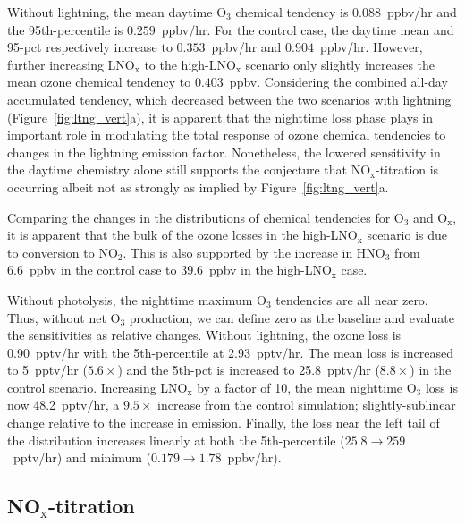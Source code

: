 Without lightning, the mean daytime O$_3$ chemical tendency is $0.088$~ppbv/hr and the
95th-percentile is $0.259$~ppbv/hr. For the control case, the daytime mean
and 95-pct respectively increase to $0.353$~ppbv/hr and $0.904$~ppbv/hr.
However, further increasing LNO$_\mathrm{x}$ to the high-LNO$_\mathrm{x}$
scenario only slightly increases the mean ozone chemical tendency to $0.403$~ppbv.
Considering the combined all-day accumulated tendency, which decreased
between the two scenarios with lightning (Figure~\ref{fig:ltng_vert}a), it is apparent
that the nighttime loss phase plays in important role in modulating the total
response of ozone chemical tendencies to changes in the lightning emission factor.
Nonetheless, the lowered sensitivity in the daytime chemistry alone still supports
the conjecture that NO$_\mathrm{x}$-titration is occurring albeit not as strongly
as implied by Figure~\ref{fig:ltng_vert}a.

Comparing the changes in the distributions of chemical tendencies for
O$_3$ and O$_{\mathrm{x}}$, it is apparent that the bulk of the ozone losses in the
high-LNO$_{\mathrm{x}}$ scenario is due to conversion to NO$_2$. This is also
supported by the increase in HNO$_3$ from 6.6~ppbv in the control
case to 39.6~ppbv in the high-LNO$_{\mathrm{x}}$ case.

Without photolysis, the nighttime maximum O$_3$ tendencies are all
near zero. Thus, without net O$_3$ production, we can define zero as the baseline and evaluate
the sensitivities as relative changes. Without lightning, the ozone loss is 0.90~pptv/hr
with the 5th-percentile at 2.93~pptv/hr. The mean loss is increased to 5~pptv/hr
($5.6\times$) and the 5th-pct is increased to 25.8~pptv/hr ($8.8\times$) in
the control scenario. Increasing LNO$_\mathrm{x}$ by a factor of 10, the mean nighttime O$_3$ loss
is now 48.2~pptv/hr, a $9.5\times$ increase from the control simulation;
slightly-sublinear change relative to the increase in emission. Finally, the loss near the
left tail of the distribution increases linearly at both the 5th-percentile
($25.8\rightarrow259$~pptv/hr) and minimum ($0.179\rightarrow1.78$~ppbv/hr).

\subsection{NO$_\mathrm{x}$-titration}

